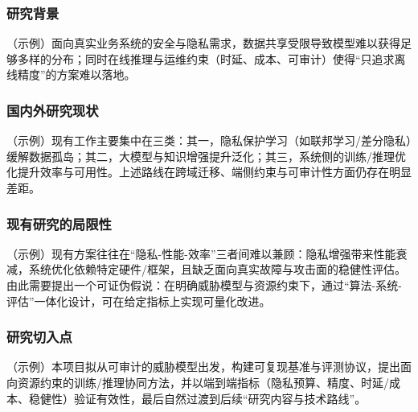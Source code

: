
\subsubsection{研究背景}
\justifying\indent
（示例）面向真实业务系统的安全与隐私需求，数据共享受限导致模型难以获得足够多样的分布；同时在线推理与运维约束（时延、成本、可审计）使得“只追求离线精度”的方案难以落地。

\subsubsection{国内外研究现状}
\indent
（示例）现有工作主要集中在三类：其一，隐私保护学习（如联邦学习/差分隐私）缓解数据孤岛；其二，大模型与知识增强提升泛化；其三，系统侧的训练/推理优化提升效率与可用性。上述路线在跨域迁移、端侧约束与可审计性方面仍存在明显差距。

\subsubsection{现有研究的局限性}
\indent
（示例）现有方案往往在“隐私-性能-效率”三者间难以兼顾：隐私增强带来性能衰减，系统优化依赖特定硬件/框架，且缺乏面向真实故障与攻击面的稳健性评估。由此需要提出一个可证伪假说：在明确威胁模型与资源约束下，通过“算法-系统-评估”一体化设计，可在给定指标上实现可量化改进。

\subsubsection{研究切入点}
\indent
（示例）本项目拟从可审计的威胁模型出发，构建可复现基准与评测协议，提出面向资源约束的训练/推理协同方法，并以端到端指标（隐私预算、精度、时延/成本、稳健性）验证有效性，最后自然过渡到后续“研究内容与技术路线”。


